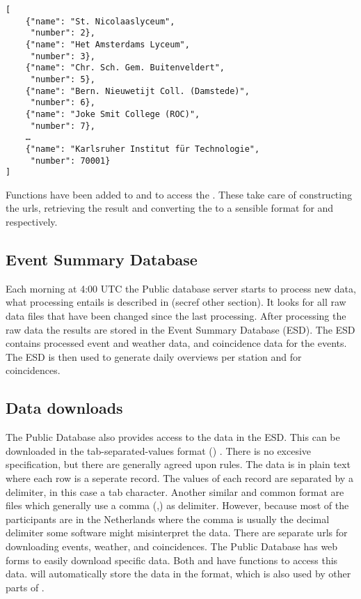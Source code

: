 \begin{verbatim}
[
    {"name": "St. Nicolaaslyceum",
     "number": 2},
    {"name": "Het Amsterdams Lyceum",
     "number": 3},
    {"name": "Chr. Sch. Gem. Buitenveldert",
     "number": 5},
    {"name": "Bern. Nieuwetijt Coll. (Damstede)",
     "number": 6},
    {"name": "Joke Smit College (ROC)",
     "number": 7},
    …
    {"name": "Karlsruher Institut für Technologie",
     "number": 70001}
]
\end{verbatim}

Functions have been added to \sapphire and \jsparc to access the \api. These take care of constructing the urls, retrieving the result and converting the \json to a sensible format for \python and \javascript respectively.


\subsection{Event Summary Database}

Each morning at 4:00 UTC the Public database server starts to process new data, what processing entails is described in (secref other section). It looks for all raw data files that have been changed since the last processing. After processing the raw data the results are stored in the Event Summary Database (ESD). The ESD contains processed event and weather data, and coincidence data for the events. The ESD is then used to generate daily overviews per station and for coincidences.


\subsection{Data downloads}

The Public Database also provides access to the data in the ESD. This can be downloaded in the tab-separated-values format (\tsv) \cite{ianatexttsv}. There is no excesive \tsv specification, but there are generally agreed upon rules. The data is in plain text where each row is a seperate record. The values of each record are separated by a delimiter, in this case a tab character. Another similar and common format are \csv files which generally use a comma (,) as delimiter. However, because most of the \hisparc participants are in the Netherlands where the comma is usually the decimal delimiter some software might misinterpret the data. There are separate urls for downloading events, weather, and coincidences. The Public Database has web forms to easily download specific data. Both \sapphire and \jsparc have functions to access this data. \sapphire will automatically store the data in the \hdf format, which is also used by other parts of \sapphire.


